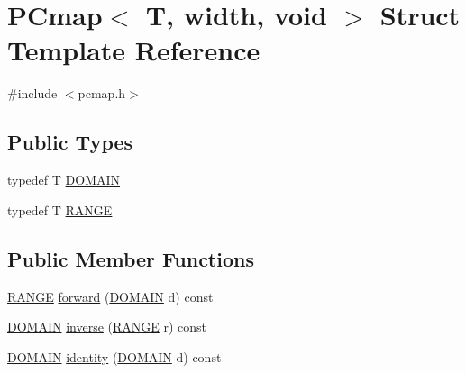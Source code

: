 \hypertarget{struct_p_cmap_3_01_t_00_01width_00_01void_01_4}{}\section{P\+Cmap$<$ T, width, void $>$ Struct Template Reference}
\label{struct_p_cmap_3_01_t_00_01width_00_01void_01_4}


{\ttfamily \#include $<$pcmap.\+h$>$}

\subsection*{Public Types}
\begin{DoxyCompactItemize}
\item 
typedef T \hyperlink{struct_p_cmap_3_01_t_00_01width_00_01void_01_4_a2bacfdf01f29a1129b39cb4ba7e5325b}{D\+O\+M\+A\+I\+N}
\item 
typedef T \hyperlink{struct_p_cmap_3_01_t_00_01width_00_01void_01_4_aa2de54b8c8232f2ab6907bc5ad5a98f0}{R\+A\+N\+G\+E}
\end{DoxyCompactItemize}
\subsection*{Public Member Functions}
\begin{DoxyCompactItemize}
\item 
\hyperlink{struct_p_cmap_3_01_t_00_01width_00_01void_01_4_aa2de54b8c8232f2ab6907bc5ad5a98f0}{R\+A\+N\+G\+E} \hyperlink{struct_p_cmap_3_01_t_00_01width_00_01void_01_4_a51c1a97bc5dc8e8ab829b582c6dceee1}{forward} (\hyperlink{struct_p_cmap_3_01_t_00_01width_00_01void_01_4_a2bacfdf01f29a1129b39cb4ba7e5325b}{D\+O\+M\+A\+I\+N} d) const 
\item 
\hyperlink{struct_p_cmap_3_01_t_00_01width_00_01void_01_4_a2bacfdf01f29a1129b39cb4ba7e5325b}{D\+O\+M\+A\+I\+N} \hyperlink{struct_p_cmap_3_01_t_00_01width_00_01void_01_4_a629836b449d6e3ed407c976a2ef827bf}{inverse} (\hyperlink{struct_p_cmap_3_01_t_00_01width_00_01void_01_4_aa2de54b8c8232f2ab6907bc5ad5a98f0}{R\+A\+N\+G\+E} r) const 
\item 
\hyperlink{struct_p_cmap_3_01_t_00_01width_00_01void_01_4_a2bacfdf01f29a1129b39cb4ba7e5325b}{D\+O\+M\+A\+I\+N} \hyperlink{struct_p_cmap_3_01_t_00_01width_00_01void_01_4_a22111fcc12316cdefb6414ae7a2d7af4}{identity} (\hyperlink{struct_p_cmap_3_01_t_00_01width_00_01void_01_4_a2bacfdf01f29a1129b39cb4ba7e5325b}{D\+O\+M\+A\+I\+N} d) const 
\end{DoxyCompactItemize}

